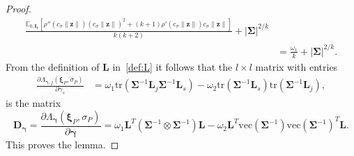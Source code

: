 \documentclass{article}
\numberwithin{equation}{section}
\theoremstyle{plain}
\newcommand{\vc}{\mathrm{vec}}
\newcommand{\bxi}{\bm\xi}
\newcommand{\bgamma}{\bm\gamma}
\newcommand{\bSigma}{\mathbf{\Sigma}}
\newcommand{\bz}{\mathbf{z}}
\newcommand{\bD}{\mathbf{D}}
\newcommand{\bL}{\mathbf{L}}
\begin{document}
\begin{proof}
\[\begin{split}
\frac{\mathbb{E}_{0,\mathbf{I}_k}
\left[
\rho''(c_\sigma\|\bz\|)(c_\sigma\|\bz\|)^2+(k+1)\rho'(c_\sigma\|\bz\|)c_\sigma\|\bz\|
\right]}{k(k+2)}
+
|\bSigma|^{2/k}\\
&=
\frac{\omega_1}{k}+|\bSigma|^{2/k}.
\end{split}
\]
From the definition of $\bL$ in~\eqref{def:L} it follows that the $l\times l$ matrix with entries
\[
\begin{split}
\frac{\partial\Lambda_{\bgamma,j}(\bxi_P,\sigma_P)}{\partial \gamma_s}
&=
\omega_1\text{tr}(\bSigma^{-1}\bL_j\bSigma^{-1}\bL_s)
-
\omega_2\text{tr}(\bSigma^{-1}\bL_s)\text{tr}(\bSigma^{-1}\bL_j),
\end{split}
\]
is the matrix
\[
\bD_{\bgamma}
=
\frac{\partial\Lambda_{\bgamma}(\bxi_P,\sigma_P)}{\partial \bgamma}
=
\omega_1\mathbf{L}^T\left(\bSigma^{-1}\otimes\bSigma^{-1}\right)\mathbf{L}
-
\omega_2\mathbf{L}^T
\vc(\bSigma^{-1})
\vc(\bSigma^{-1})^T
\mathbf{L}.
\]
This proves the lemma.
\end{proof}
\end{document}
